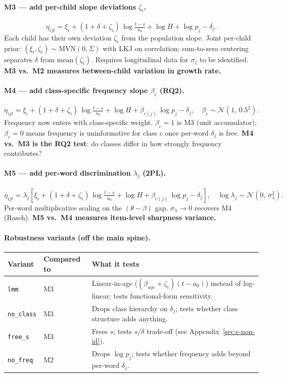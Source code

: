 \documentclass[11pt]{article}
\newcommand{\Norm}{\mathcal{N}}
\begin{document}
\paragraph{M3 — add per-child slope deviations \(\zeta_i\).}
\[
\eta_{ijt} = \xi_i + (1 + \delta + \zeta_i)\,\log\!\tfrac{t-s}{a_0} + \log H + \log p_j - \delta_j.
\]
Each child has their own deviation \(\zeta_i\) from the population
slope. Joint per-child prior:
\((\xi_i, \zeta_i) \sim \mathrm{MVN}(0,\Sigma)\) with LKJ on
correlation; sum-to-zero centering separates \(\delta\) from
\(\mathrm{mean}(\zeta_i)\). Requires longitudinal data for
\(\sigma_\zeta\) to be identified. \textbf{M3 vs.\ M2 measures
between-child variation in growth rate.}

\paragraph{M4 — add class-specific frequency slope \(\beta_c\) (RQ2).}
\[
\eta_{ijt} = \xi_i + (1 + \delta + \zeta_i)\,\log\!\tfrac{t-s}{a_0} + \log H + \beta_{c(j)}\,\log p_j - \delta_j,
\quad \beta_c \sim \Norm(1,\,0.5^2).
\]
Frequency now enters with class-specific weight. \(\beta_c = 1\) is
M3 (unit accumulator); \(\beta_c = 0\) means frequency is uninformative
for class \(c\) once per-word \(\delta_j\) is free.
\textbf{M4 vs.\ M3 is the RQ2 test}: do classes differ in how
strongly frequency contributes?

\paragraph{M5 — add per-word discrimination \(\lambda_j\) (2PL).}
\[
\eta_{ijt} = \lambda_j\!\left[\xi_i + (1 + \delta + \zeta_i)\,\log\!\tfrac{t-s}{a_0} + \log H + \beta_{c(j)}\,\log p_j - \delta_j\right],
\quad \log \lambda_j \sim \Norm(0,\,\sigma_\lambda^2).
\]
Per-word multiplicative scaling on the \((\theta - \beta)\) gap.
\(\sigma_\lambda \to 0\) recovers M4 (Rasch).  \textbf{M5 vs.\ M4
measures item-level sharpness variance.}

\paragraph{Robustness variants (off the main spine).}

\begin{center}
\small
\begin{tabular}{@{}lll@{}}
\toprule
Variant & Compared to & What it tests \\
\midrule
\texttt{lmm}     & M3 & Linear-in-age (\((\beta_{age} + \zeta_i)(t - a_0)\)) instead of log-linear; tests functional-form sensitivity. \\
\texttt{no\_class} & M3 & Drops class hierarchy on \(\delta_j\); tests whether class structure adds anything. \\
\texttt{free\_s}  & M3 & Frees \(s\); tests \(s\)/\(\delta\) trade-off (see Appendix~\ref{sec:s-non-id}). \\
\texttt{no\_freq} & M2 & Drops \(\log p_j\); tests whether frequency adds beyond per-word \(\delta_j\). \\
\bottomrule
\end{tabular}
\end{center}
\end{document}
